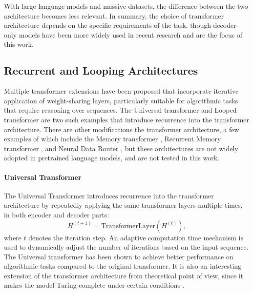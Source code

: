 With large language models and massive datasets, the difference between the two architecture becomes less relevant. In summary, the choice of transformer architecture depends on the specific requirements of the task, though decoder-only models have been more widely used in recent research and are the focus of this work.

\subsection{Recurrent and Looping Architectures}\label{subsec:recurrent_looping}

Multiple transformer extensions have been proposed that incorporate iterative application of weight-sharing layers, particularly suitable for algorithmic tasks that require reasoning over sequences. The Universal transformer and Looped transformer are two such examples that introduce recurrence into the transformer architecture. There are other modifications the transformer architecture, a few examples of which include the Memory transformer \parencite{burtsev_memory_2021}, Recurrent Memory transformer \parencite{bulatov_recurrent_2022}, and Neural Data Router \parencite{csordas_neural_2021}, but these architectures are not widely adopted in pretrained language models, and are not tested in this work.

\paragraph{Universal Transformer}
The Universal Transformer \parencite{dehghani_universal_2018} introduces recurrence into the transformer architecture by repeatedly applying the same transformer layers multiple times, in both encoder and decoder parts:
\begin{equation*}
    H^{(t+1)} = \text{TransformerLayer}(H^{(t)}),
\end{equation*}
where $t$ denotes the iteration step. An adaptive computation time mechanism is used to dynamically adjust the number of iterations based on the input sequence. The Universal transformer has been shown to achieve better performance on algorithmic tasks compared to the original transformer. It is also an interesting extension of the transformer architecture from theoretical point of view, since it makes the model Turing-complete under certain conditions \parencite{dehghani_universal_2018}.

